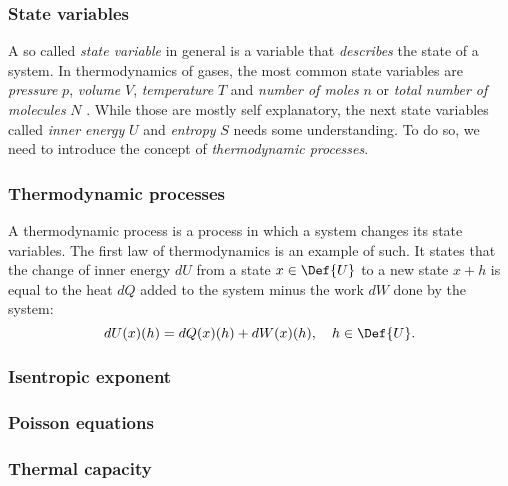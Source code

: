 \documentclass{subfiles}
\begin{document}
        \subsubsection*{State variables}
            A so called \emph{state variable} in general is a variable that \emph{describes} the state of a system. In thermodynamics of gases, the most common state variables are \emph{pressure} $p$, \emph{volume} $V$, \emph{temperature} $T$ and \emph{number of moles} $n$ or \emph{total number of molecules} $N$ \cite[p.5]{nolting42}. While those are mostly self explanatory, the next state variables called \emph{inner energy} $U$ and \emph{entropy} $S$ needs some understanding. To do so, we need to introduce the concept of \emph{thermodynamic processes}.
        \subsubsection*{Thermodynamic processes}
            A thermodynamic process is a process in which a system changes its state variables. The first law of thermodynamics is an example of such. It states that the change of inner energy $dU$ from a state $x\in\Def{U}$ to a new state $x + h$ is equal to the heat $dQ$ added to the system minus the work $dW$ done by the system:
            \[dU(x)(h) = dQ(x)(h) + dW(x)(h),\quad h\in\Def{U}.\]

        \subsubsection*{Isentropic exponent}

        \subsubsection*{Poisson equations}

        \subsubsection*{Thermal capacity}


\end{document}
